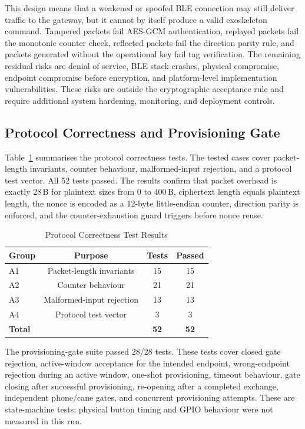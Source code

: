 \documentclass[journal]{IEEEtran}
\begin{document}
This design means that a weakened or spoofed BLE connection may still deliver traffic to the gateway, but it cannot by itself produce a valid exoskeleton command. Tampered packets fail AES-GCM authentication, replayed packets fail the monotonic counter check, reflected packets fail the direction parity rule, and packets generated without the operational key fail tag verification. The remaining residual risks are denial of service, BLE stack crashes, physical compromise, endpoint compromise before encryption, and platform-level implementation vulnerabilities. These risks are outside the cryptographic acceptance rule and require additional system hardening, monitoring, and deployment controls.



\subsection{Protocol Correctness and Provisioning Gate}

Table~\ref{tab:correctness} summarises the protocol correctness tests. The tested cases cover packet-length invariants, counter behaviour, malformed-input rejection, and a protocol test vector. All 52 tests passed. The results confirm that packet overhead is exactly 28\,B for plaintext sizes from 0 to 400\,B, ciphertext length equals plaintext length, the nonce is encoded as a 12-byte little-endian counter, direction parity is enforced, and the counter-exhaustion guard triggers before nonce reuse.

\begin{table}[!t]
\renewcommand{\arraystretch}{1.15}
\caption{Protocol Correctness Test Results}
\label{tab:correctness}
\centering
\scriptsize
\begin{tabular}{lccc}
\toprule
\textbf{Group} & \textbf{Purpose} & \textbf{Tests} & \textbf{Passed} \\
\midrule
A1 & Packet-length invariants & 15 & 15 \\
A2 & Counter behaviour & 21 & 21 \\
A3 & Malformed-input rejection & 13 & 13 \\
A4 & Protocol test vector & 3 & 3 \\
\midrule
\textbf{Total} & & \textbf{52} & \textbf{52} \\
\bottomrule
\end{tabular}
\end{table}

The provisioning-gate suite passed 28/28 tests. These tests cover closed gate rejection, active-window acceptance for the intended endpoint, wrong-endpoint rejection during an active window, one-shot provisioning, timeout behaviour, gate closing after successful provisioning, re-opening after a completed exchange, independent phone/cane gates, and concurrent provisioning attempts. These are state-machine tests; physical button timing and GPIO behaviour were not measured in this run.
\end{document}
